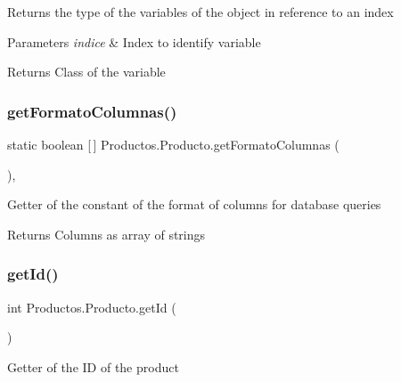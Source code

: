 Returns the type of the variables of the object in reference to an index


\begin{DoxyParams}{Parameters}
{\em indice} & Index to identify variable \\
\hline
\end{DoxyParams}
\begin{DoxyReturn}{Returns}
Class of the variable 
\end{DoxyReturn}
\mbox{\label{class_productos_1_1_producto_a1a5e9f3b94441b04e3e074f25648c188}} 
\subsubsection{\texorpdfstring{get\+Formato\+Columnas()}{getFormatoColumnas()}}
{\footnotesize\ttfamily static boolean \mbox{[}$\,$\mbox{]} Productos.\+Producto.\+get\+Formato\+Columnas (\begin{DoxyParamCaption}{ }\end{DoxyParamCaption})\hspace{0.3cm}{\ttfamily [inline]}, {\ttfamily [static]}}

Getter of the constant of the format of columns for database queries

\begin{DoxyReturn}{Returns}
Columns as array of strings 
\end{DoxyReturn}
\mbox{\label{class_productos_1_1_producto_ad91315ab5e1fe2699a805125e5c50e2c}} 
\subsubsection{\texorpdfstring{get\+Id()}{getId()}}
{\footnotesize\ttfamily int Productos.\+Producto.\+get\+Id (\begin{DoxyParamCaption}{ }\end{DoxyParamCaption})\hspace{0.3cm}{\ttfamily [inline]}}

Getter of the ID of the product

